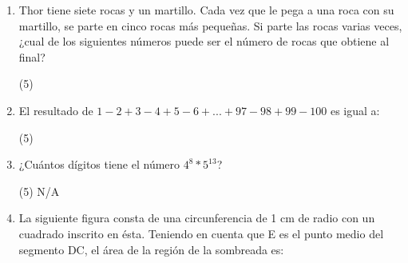 \documentclass{article}
\begin{document}
\begin{enumerate}
{          %
          }
    \item Thor tiene siete rocas y un martillo. Cada vez que le pega a una roca con su martillo, se parte en cinco rocas más pequeñas. Si parte las rocas varias veces, ¿cual de los siguientes números puede ser el número de rocas que obtiene al final? \\ \begin{tasks}[label=\Alph*.](5)
          \end{tasks}
    \item El resultado de $1-2+3-4+5-6+...+97-98+99-100$ es igual a: \\ \begin{tasks}[label=\Alph*.](5)
          \end{tasks}
    \item ¿Cuántos dígitos tiene el número $4^8 * 5^{13}$? \\ \begin{tasks}[label=\Alph*.](5)
              \task N/A
          \end{tasks}
    \item{La siguiente figura consta de una circunferencia de 1 cm de radio con un cuadrado inscrito en ésta. Teniendo en cuenta que E es el punto medio del segmento DC, el área de la región de la sombreada es: \\ \begin{center} 
\end{center}}
\end{enumerate}
\end{document}
